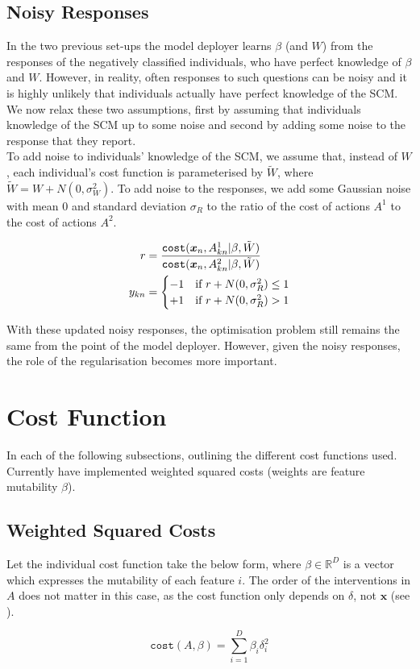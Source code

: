 \subsection{Noisy Responses}

In the two previous set-ups the model deployer learns $\beta$ (and $W$) from the responses of the negatively classified individuals, who have perfect knowledge of $\beta$ and $W$. However, in reality, often responses to such questions can be noisy and it is highly unlikely that individuals actually have perfect knowledge of the SCM. We now relax these two assumptions, first by assuming that individuals knowledge of the SCM up to some noise and second by adding some noise to the response that they report.\\

To add noise to individuals' knowledge of the SCM, we assume that, instead of $W$, each individual's cost function is parameterised by $\tilde{W}$, where $\tilde{W} = W + N(0, \sigma^2_W)$. To add noise to the responses, we add some Gaussian noise with mean 0 and standard deviation $\sigma_R$ to the ratio of the cost of actions $A^1$ to the cost of actions $A^2$. 

\begin{align}
	r & = \frac{\operatorname*{\texttt{cost}}(\boldsymbol{x}_n, A^1_{kn} | \beta, \tilde{W})}{\operatorname*{\texttt{cost}}(\boldsymbol{x}_n, A^2_{kn} | \beta, \tilde{W})} \\ \nonumber
	y_{kn} & = \begin{cases}
			-1 & \text{if } r + N(0, \sigma^2_R) \leq 1 \\
			+1 & \text{if } r + N(0, \sigma^2_R) > 1 \\
			\end{cases}
\end{align}

With these updated noisy responses, the optimisation problem still remains the same from the point of the model deployer. However, given the noisy responses, the role of the regularisation becomes more important.

\section{Cost Function}
In each of the following subsections, outlining the different cost functions used. Currently have implemented weighted squared costs (weights are feature mutability $\beta$).

\subsection{Weighted Squared Costs}

Let the individual cost function take the below form, where $\beta \in \mathbb{R}^D$ is a vector which expresses the mutability of each feature $i$. The order of the interventions in $A$ does not matter in this case, as the cost function only depends on $\delta$, not $\boldsymbol{x}$ (see ).

\begin{equation}
	\texttt{cost}(A, \beta) = \sum_{i=1}^D \beta_i \delta^2_i
\end{equation}
